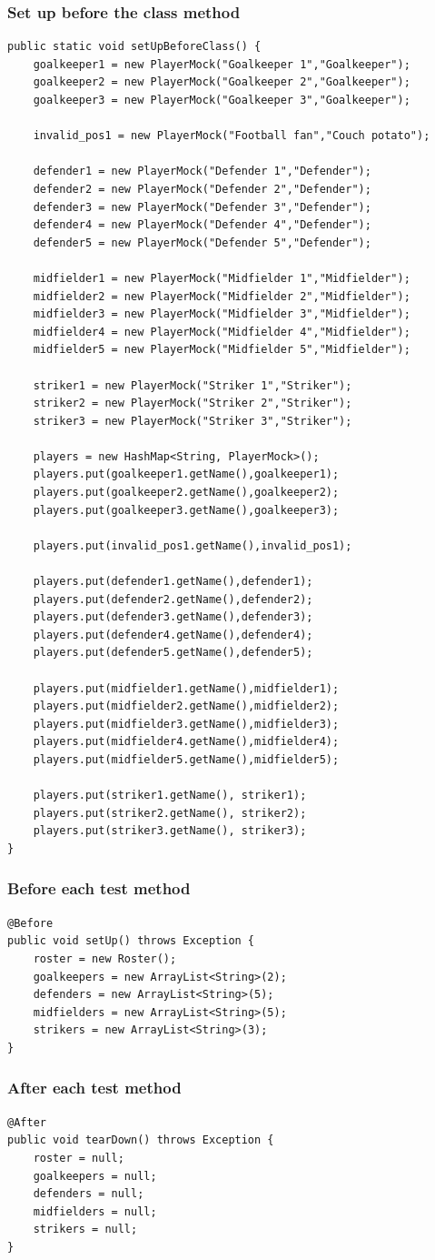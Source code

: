 \documentclass{article}
\begin{document}
\subsubsection*{Set up before the class method}
\begin{lstlisting}
public static void setUpBeforeClass() {
	goalkeeper1 = new PlayerMock("Goalkeeper 1","Goalkeeper");
	goalkeeper2 = new PlayerMock("Goalkeeper 2","Goalkeeper");
	goalkeeper3 = new PlayerMock("Goalkeeper 3","Goalkeeper");
	
	invalid_pos1 = new PlayerMock("Football fan","Couch potato");
	
	defender1 = new PlayerMock("Defender 1","Defender");
	defender2 = new PlayerMock("Defender 2","Defender");
	defender3 = new PlayerMock("Defender 3","Defender");
	defender4 = new PlayerMock("Defender 4","Defender");
	defender5 = new PlayerMock("Defender 5","Defender");
	
	midfielder1 = new PlayerMock("Midfielder 1","Midfielder");
	midfielder2 = new PlayerMock("Midfielder 2","Midfielder");
	midfielder3 = new PlayerMock("Midfielder 3","Midfielder");
	midfielder4 = new PlayerMock("Midfielder 4","Midfielder");
	midfielder5 = new PlayerMock("Midfielder 5","Midfielder");
	
	striker1 = new PlayerMock("Striker 1","Striker");
	striker2 = new PlayerMock("Striker 2","Striker");
	striker3 = new PlayerMock("Striker 3","Striker");
	
	players = new HashMap<String, PlayerMock>();
	players.put(goalkeeper1.getName(),goalkeeper1);
	players.put(goalkeeper2.getName(),goalkeeper2);
	players.put(goalkeeper3.getName(),goalkeeper3);
	
	players.put(invalid_pos1.getName(),invalid_pos1);
	
	players.put(defender1.getName(),defender1);
	players.put(defender2.getName(),defender2);
	players.put(defender3.getName(),defender3);
	players.put(defender4.getName(),defender4);
	players.put(defender5.getName(),defender5);
	
	players.put(midfielder1.getName(),midfielder1);
	players.put(midfielder2.getName(),midfielder2);
	players.put(midfielder3.getName(),midfielder3);
	players.put(midfielder4.getName(),midfielder4);
	players.put(midfielder5.getName(),midfielder5);
	
	players.put(striker1.getName(), striker1);
	players.put(striker2.getName(), striker2);
	players.put(striker3.getName(), striker3);
}
\end{lstlisting}

\subsubsection*{Before each test method}
\begin{lstlisting}
@Before
public void setUp() throws Exception {
	roster = new Roster();
	goalkeepers = new ArrayList<String>(2);
	defenders = new ArrayList<String>(5);
	midfielders = new ArrayList<String>(5);
	strikers = new ArrayList<String>(3);
}
\end{lstlisting}

\subsubsection*{After each test method}
\begin{lstlisting}
@After
public void tearDown() throws Exception {
	roster = null;
	goalkeepers = null;
	defenders = null;
	midfielders = null;
	strikers = null;
}
\end{lstlisting}
\end{document}
